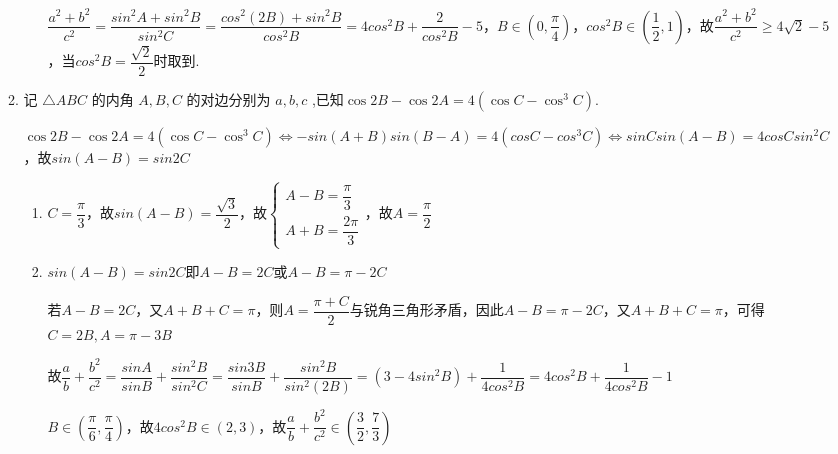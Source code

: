 \begin{enumerate}
\begin{enumerate}
\begin{jieda}
\begin{enumerate}
            $\dfrac{{a}^{2} + {b}^{2}}{{c}^{2}} = \dfrac{sin^2A+sin^2B}{sin^2C} = \dfrac{cos^2(2B) + sin^2B}{cos^2B} = 4cos^2B + \dfrac{2}{cos^2B}-5$，$B \in \left(0, \dfrac{\pi}{4}\right)$，$cos^2B \in \left(\dfrac{1}{2}, 1\right)$，故$\dfrac{{a}^{2} + {b}^{2}}{{c}^{2}} \geq 4\sqrt{2} - 5$，当$cos^2B = \dfrac{\sqrt{2}}{2}$时取到.
        \end{enumerate}
    \end{jieda}
    \item 记 $\bigtriangleup {ABC}$ 的内角 $A,B,C$ 的对边分别为 $a,b,c$ ,已知$\cos {2B} - \cos {2A} = 4\left( {\cos C - {\cos }^{3}C}\right) .$
    
    \begin{jieda}
        $\cos {2B} - \cos {2A} = 4\left( {\cos C - {\cos }^{3}C}\right) \Longleftrightarrow -sin(A+B)sin(B-A) = 4(cosC-cos^3C) \Longleftrightarrow sinCsin(A-B) = 4cosCsin^2C$，故$sin(A-B) = sin2C$
        \begin{enumerate}
            \item $C = \dfrac{\pi}{3}$，故$sin(A-B) = \dfrac{\sqrt{3}}{2}$，故$\left\{\begin{array}{l}
                 A-B = \dfrac{\pi}{3}  \\
                 A+B = \dfrac{2\pi}{3}
            \end{array}\right.$，故$A = \dfrac{\pi}{2}$
            \item $sin(A-B) = sin2C$即$A-B=2C$或$A-B = \pi -2C$
            
            若$A-B=2C$，又$A+B+C=\pi$，则$A = \dfrac{\pi+C}{2}$与锐角三角形矛盾，因此$A-B = \pi - 2C$，又$A+B+C=\pi$，可得$C = 2B, A = \pi - 3B$

            故$\dfrac{a}{b} + \dfrac{{b}^{2}}{{c}^{2}} = \dfrac{sinA}{sinB} + \dfrac{sin^2B}{sin^2C} = \dfrac{sin3B}{sinB} + \dfrac{sin^2B}{sin^2(2B)} = (3-4sin^2B) + \dfrac{1}{4cos^2B} = 4cos^2B+\dfrac{1}{4cos^2B}-1$

            $B \in \left(\dfrac{\pi}{6}, \dfrac{\pi}{4}\right)$，故$4cos^2B \in (2, 3)$，故$\dfrac{a}{b} + \dfrac{{b}^{2}}{{c}^{2}} \in \left(\dfrac{3}{2}, \dfrac{7}{3}\right)$
        \end{enumerate}
    \end{jieda}
    

\end{enumerate}
\end{enumerate}
